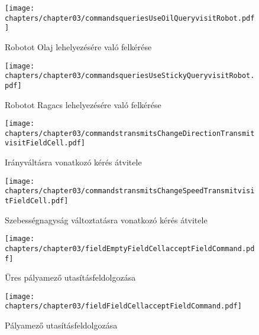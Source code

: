 \begin{figure}[h]
	\begin{center}
		\texttt{[image: chapters/chapter03/commandsqueriesUseOilQueryvisitRobot.pdf]}
		\caption{Robotot Olaj lehelyezésére való felkérése}
		\label{fig:command.executes.UseOilQuery.visit}
	\end{center}
\end{figure}

\begin{figure}[h]
	\begin{center}
		\texttt{[image: chapters/chapter03/commandsqueriesUseStickyQueryvisitRobot.pdf]}
		\caption{Robotot Ragacs lehelyezésére való felkérése}
		\label{fig:command.executes.UseStickyQuery.visit}
	\end{center}
\end{figure}

\begin{figure}[h]
	\begin{center}
		\texttt{[image: chapters/chapter03/commandstransmitsChangeDirectionTransmitvisitFieldCell.pdf]}
		\caption{Irányváltásra vonatkozó kérés átvitele}
		\label{fig:command.executes.ChangeDirectionTransmit.visit}
	\end{center}
\end{figure}

\begin{figure}[h]
	\begin{center}
		\texttt{[image: chapters/chapter03/commandstransmitsChangeSpeedTransmitvisitFieldCell.pdf]}
		\caption{Szebességnagyság változtatásra vonatkozó kérés átvitele}
		\label{fig:command.executes.ChangeSpeedTransmit.visit}
	\end{center}
\end{figure}

\begin{figure}[h]
	\begin{center}
		\texttt{[image: chapters/chapter03/fieldEmptyFieldCellacceptFieldCommand.pdf]}
		\caption{Üres pályamező utasításfeldolgozása}
		\label{fig:field.EmptyFieldCell.accept}
	\end{center}
\end{figure}

\begin{figure}[h]
	\begin{center}
		\texttt{[image: chapters/chapter03/fieldFieldCellacceptFieldCommand.pdf]}
		\caption{Pályamező utasításfeldolgozása}
		\label{fig:field.FieldCell.accept}
	\end{center}
\end{figure}

